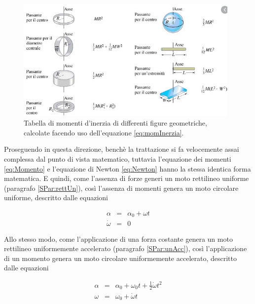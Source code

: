 \documentclass[17pt]{extarticle}
\begin{document}
\begin{figure}[b!]		
	\centering
   	\includegraphics[width=4.3in]{momentiDInerzia.png}%
  	\caption{Tabella di momenti d'inerzia di differenti figure geometriche, calcolate facendo uso dell'equazione \ref{eq:momInerzia}.}
   	\label{fig:momentiDInerzia}%
\end{figure}


Proseguendo in questa direzione, benchè la trattazione si fa velocemente assai complessa dal punto di vista matematico, tuttavia l'equazione dei momenti \ref{eq:Momento} e l'equazione di Newton \ref{eq:Newton} hanno la stessa identica forma matematica. E quindi, come l'assenza di forze generi un moto rettilineo uniforme (paragrafo \ref{SPar:rettUn}), così l'assenza di momenti genera un moto circolare uniforme, descritto dalle equazioni

\begin{eqnarray}
	\alpha & = & \alpha_0 + \omega t\\
	\dot{\omega} & = & 0
\end{eqnarray}

Allo stesso modo, come l'applicazione di una forza costante genera un moto rettilineo uniformemente accelerato (paragrafo \ref{SPar:unAcc}), così l'applicazione di un momento genera un moto circolare uniformemente accelerato, descritto dalle equazioni

\begin{eqnarray}
	\alpha & = & \alpha_0 + \omega_0 t + \frac{1}{2}\dot{\omega}t^2\\
	\omega & = & \omega_0 + \dot{\omega}t
\end{eqnarray}
\end{document}
